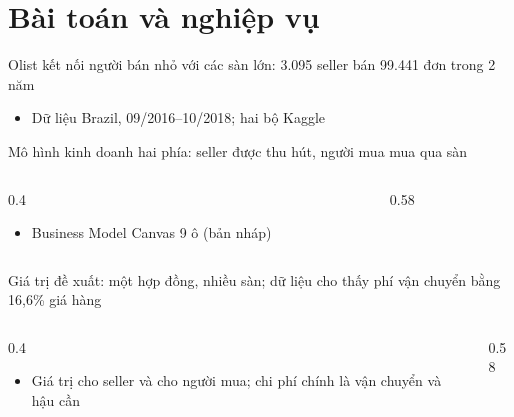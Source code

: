 \section[Bài toán và nghiệp vụ]{Bài toán và nghiệp vụ}

\begin{frame}{Olist kết nối người bán nhỏ với các sàn lớn: 3.095 seller bán 99.441 đơn trong 2 năm}
\begin{itemize}
  \item Dữ liệu Brazil, 09/2016–10/2018; hai bộ Kaggle
\end{itemize}
\canxacnhan
{}
\end{frame}

\begin{frame}{Mô hình kinh doanh hai phía: seller được thu hút, người mua mua qua sàn}
\begin{columns}[T]\begin{column}{0.4\textwidth}
\begin{itemize}
  \item Business Model Canvas 9 ô (bản nháp)
\end{itemize}
\end{column}\begin{column}{0.58\textwidth}
\begin{center}\end{center}
\end{column}\end{columns}
\canxacnhan
{}
\end{frame}

\begin{frame}{Giá trị đề xuất: một hợp đồng, nhiều sàn; dữ liệu cho thấy phí vận chuyển bằng 16,6\% giá hàng}
\begin{columns}[T]\begin{column}{0.4\textwidth}
\begin{itemize}
  \item Giá trị cho seller và cho người mua; chi phí chính là vận chuyển và hậu cần
\end{itemize}
\end{column}\begin{column}{0.58\textwidth}
\begin{center}\end{center}
\end{column}\end{columns}

\end{frame}

